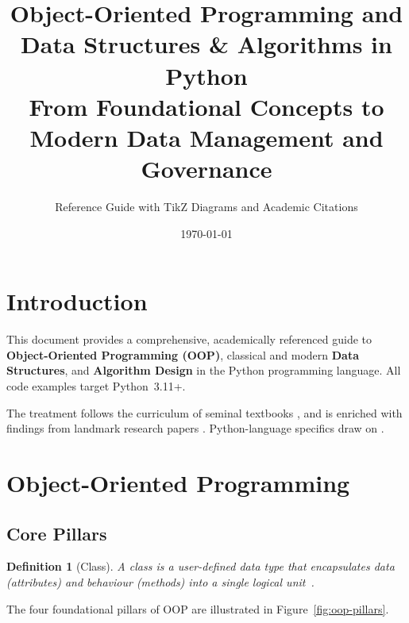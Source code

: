 \documentclass[12pt,a4paper]{article}
\title{%
  \textbf{Object-Oriented Programming and Data Structures \& Algorithms in Python}\\
  \large From Foundational Concepts to Modern Data Management and Governance
}
\author{Reference Guide with TikZ Diagrams and Academic Citations}
\date{\today}
\newtheorem{definition}{Definition}[section]
\begin{document}
\maketitle
\tableofcontents
\clearpage

\section{Introduction}

This document provides a comprehensive, academically referenced guide to
\textbf{Object-Oriented Programming (OOP)}, classical and modern
\textbf{Data Structures}, and \textbf{Algorithm Design} in the Python
programming language.  All code examples target Python~3.11+.

The treatment follows the curriculum of seminal textbooks
\cite{cormen2022,sedgewick2011,knuth1997v1,goodrich2013,skiena2020},
and is enriched with findings from landmark research papers
\cite{bloom1970,pugh1990,dijkstra1959,kruskal1956,tarjan1975}.
Python-language specifics draw on \cite{vanrossum2009,lutz2013,ramalho2022}.

\section{Object-Oriented Programming}

\subsection{Core Pillars}

\begin{definition}[Class]
A \emph{class} is a user-defined data type that encapsulates data (attributes)
and behaviour (methods) into a single logical unit~\cite{goodrich2013}.
\end{definition}

The four foundational pillars of OOP are illustrated in
Figure~\ref{fig:oop-pillars}.
\end{document}
